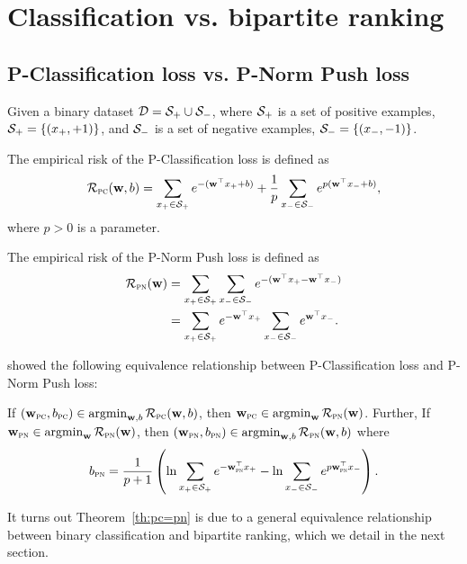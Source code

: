 \section{Classification vs. bipartite ranking}
\label{sec:binary}


\subsection{P-Classification loss vs. P-Norm Push loss}
\label{ssec:pc=pn}

Given a binary dataset $\mathcal{D} = \mathcal{S}_+ \cup \mathcal{S}_-$, where $\mathcal{S}_+$ is a set of positive examples, 
\ie $\mathcal{S}_+ = \{(x_+, +1)\}$, and $\mathcal{S}_-$ is a set of negative examples, \ie $\mathcal{S}_- = \{(x_-, -1)\}$.

The empirical risk of the P-Classification loss is defined as~\cite{ertekin2011equivalence}
\begin{equation*}
\mathcal{R}_\textsc{pc}(\mathbf{w}, b) 
= \sum_{x_+ \in \mathcal{S}_+} e^{- (\mathbf{w}^\top x_+ + b)} +
  \frac{1}{p} \sum_{x_- \in \mathcal{S}_-} e^{p (\mathbf{w}^\top x_- + b)},
\end{equation*}
where $p > 0$ is a parameter.

The empirical risk of the P-Norm Push loss is defined as~\cite{rudin2009p}
\begin{equation*}
\begin{aligned}
\mathcal{R}_\textsc{pn}(\mathbf{w})
&= \sum_{x_+ \in \mathcal{S}_+} \sum_{x_- \in \mathcal{S}_-} e^{-(\mathbf{w}^\top x_+ - \mathbf{w}^\top x_-)} \\
&= \sum_{x_+ \in \mathcal{S}_+} e^{-\mathbf{w}^\top x_+} \sum_{x_- \in \mathcal{S}_-} e^{\mathbf{w}^\top x_-}.
\end{aligned}
\end{equation*}

\cite{ertekin2011equivalence} showed the following equivalence relationship between P-Classification loss and P-Norm Push loss:
\begin{theorem}
\label{th:pc=pn}
If $(\mathbf{w}_\textsc{pc}, b_\textsc{pc}) \in \operatorname*{argmin}_{\mathbf{w},b} \mathcal{R}_\textsc{pc}(\mathbf{w}, b)$, 
then $\mathbf{w}_\textsc{pc} \in \operatorname*{argmin}_{\mathbf{w}} \mathcal{R}_\textsc{pn}(\mathbf{w})$.
Further, If $\mathbf{w}_\textsc{pn} \in \operatorname*{argmin}_{\mathbf{w}} \mathcal{R}_\textsc{pn}(\mathbf{w})$, 
then $(\mathbf{w}_\textsc{pn}, b_\textsc{pn}) \in \operatorname*{argmin}_{\mathbf{w},b} \mathcal{R}_\textsc{pn}(\mathbf{w}, b)$ where
$$
b_\textsc{pn} 
= \frac{1}{p + 1} \left( 
  \ln \sum_{x_+ \in \mathcal{S}_+} e^{-\mathbf{w}_\textsc{pn}^\top x_+} - 
  \ln \sum_{x_- \in \mathcal{S}_-} e^{p\mathbf{w}_\textsc{pn}^\top x_-} \right).
$$
\end{theorem}

It turns out Theorem~\ref{th:pc=pn} is due to a general equivalence relationship 
between binary classification and bipartite ranking, which we detail in the next section.



